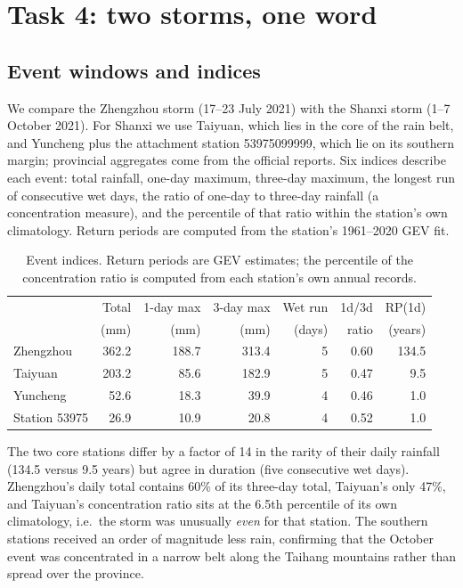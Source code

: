 \section{Task 4: two storms, one word}\label{sec:q4}

\subsection{Event windows and indices}

We compare the Zhengzhou storm (17--23 July 2021) with the Shanxi storm (1--7 October 2021). For Shanxi we use Taiyuan, which lies in the core of the rain belt, and Yuncheng plus the attachment station 53975099999, which lie on its southern margin; provincial aggregates come from the official reports. Six indices describe each event: total rainfall, one-day maximum, three-day maximum, the longest run of consecutive wet days, the ratio of one-day to three-day rainfall (a concentration measure), and the percentile of that ratio within the station's own climatology. Return periods are computed from the station's 1961--2020 GEV fit.

\begin{table}[H]
\centering
\caption{Event indices. Return periods are GEV estimates; the percentile of the concentration ratio is computed from each station's own annual records.}
\label{tab:q4event}
\small
\begin{tabular}{lrrrrrr}
\toprule
 & Total & 1-day max & 3-day max & Wet run & 1d/3d & RP(1d)\\
 & (mm) & (mm) & (mm) & (days) & ratio & (years)\\
\midrule
Zhengzhou & 362.2 & 188.7 & 313.4 & 5 & 0.60 & 134.5\\
Taiyuan & 203.2 & 85.6 & 182.9 & 5 & 0.47 & 9.5\\
Yuncheng & 52.6 & 18.3 & 39.9 & 4 & 0.46 & 1.0\\
Station 53975 & 26.9 & 10.9 & 20.8 & 4 & 0.52 & 1.0\\
\bottomrule
\end{tabular}
\end{table}

The two core stations differ by a factor of 14 in the rarity of their daily rainfall (134.5 versus 9.5 years) but agree in duration (five consecutive wet days). Zhengzhou's daily total contains 60\% of its three-day total, Taiyuan's only 47\%, and Taiyuan's concentration ratio sits at the 6.5th percentile of its own climatology, i.e.\ the storm was unusually \emph{even} for that station. The southern stations received an order of magnitude less rain, confirming that the October event was concentrated in a narrow belt along the Taihang mountains rather than spread over the province.

